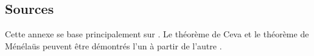 
\subsection*{Sources}

Cette annexe se base principalement sur \cite{gelfand}. Le théorème de Ceva et le théorème de Ménélaüs peuvent être démontrés l'un à partir de l'autre \cite{silvester}.
